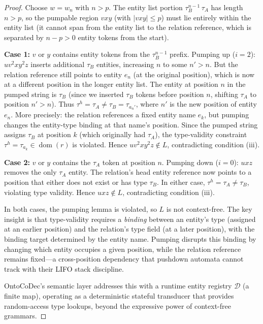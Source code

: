 \begin{proof}
Choose $w = w_n$ with $n > p$.
The entity list portion $\tau_B^{n-1}\, \tau_A$ has length $n > p$, so the pumpable region $vxy$ (with $|vxy| \leq p$) must lie entirely within the entity list (it cannot span from the entity list to the relation reference, which is separated by $n - p > 0$ entity tokens from the start).

\textbf{Case 1:} $v$ or $y$ contains entity tokens from the $\tau_B^{n-1}$ prefix.
Pumping up ($i = 2$): $uv^2 xy^2 z$ inserts additional $\tau_B$ entities, increasing $n$ to some $n' > n$.
But the relation reference still points to entity $e_n$ (at the original position), which is now at a different position in the longer entity list.
The entity at position $n$ in the pumped string is $\tau_B$ (since we inserted $\tau_B$ tokens before position $n$, shifting $\tau_A$ to position $n' > n$).
Thus $\tau^h = \tau_A \neq \tau_B = \tau_{a_n'}$, where $n'$ is the new position of entity $e_n$.
More precisely: the relation references a fixed entity name $e_k$, but pumping changes the entity-type binding at that name's position.
Since the pumped string assigns $\tau_B$ at position $k$ (which originally had $\tau_A$), the type-validity constraint $\tau^h = \tau_{a_k} \in \operatorname{dom}(r)$ is violated.
Hence $uv^2 xy^2 z \notin L$, contradicting condition (iii).

\textbf{Case 2:} $v$ or $y$ contains the $\tau_A$ token at position $n$.
Pumping down ($i = 0$): $uxz$ removes the only $\tau_A$ entity.
The relation's head entity reference now points to a position that either does not exist or has type $\tau_B$.
In either case, $\tau^h = \tau_A \neq \tau_B$, violating type validity.
Hence $uxz \notin L$, contradicting condition (iii).

In both cases, the pumping lemma is violated, so $L$ is not context-free.
The key insight is that type-validity requires a \emph{binding} between an entity's type (assigned at an earlier position) and the relation's type field (at a later position), with the binding target determined by the entity name.
Pumping disrupts this binding by changing which entity occupies a given position, while the relation reference remains fixed---a cross-position dependency that pushdown automata cannot track with their LIFO stack discipline.

OntoCoDec's semantic layer addresses this with a runtime entity registry $\mathcal{D}$ (a finite map), operating as a deterministic stateful transducer that provides random-access type lookups, beyond the expressive power of context-free grammars.
\end{proof}

